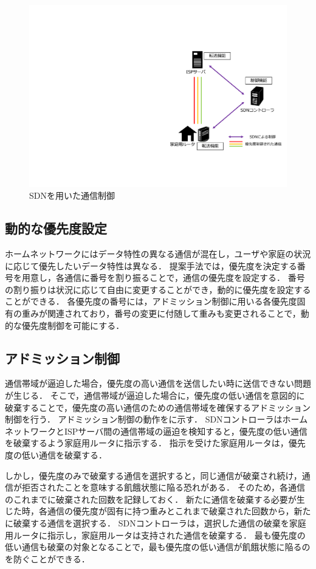\documentclass[a4paper,10pt,twocolumn,uplatex]{jsarticle}
\begin{document}
\begin{figure}[t]
	\begin{centering}
    \includegraphics[width=0.7\linewidth]{img/proposal_resume.pdf}
    \caption{SDNを用いた通信制御}
    \label{fig:proposal}
    \end{centering}
\end{figure}

\subsection{動的な優先度設定}
\label{priority}
ホームネットワークにはデータ特性の異なる通信が混在し，ユーザや家庭の状況に応じて優先したいデータ特性は異なる．
提案手法では，優先度を決定する番号を用意し，各通信に番号を割り振ることで，通信の優先度を設定する．
番号の割り振りは状況に応じて自由に変更することができ，動的に優先度を設定することができる．
各優先度の番号には，アドミッション制御に用いる各優先度固有の重みが関連されており，番号の変更に付随して重みも変更されることで，動的な優先度制御を可能にする．

\subsection{アドミッション制御}
通信帯域が逼迫した場合，優先度の高い通信を送信したい時に送信できない問題が生じる．
そこで，通信帯域が逼迫した場合に，優先度の低い通信を意図的に破棄することで，優先度の高い通信のための通信帯域を確保するアドミッション制御を行う．
アドミッション制御の動作をに示す．
SDNコントローラはホームネットワークとISPサーバ間の通信帯域の逼迫を検知すると，優先度の低い通信を破棄するよう家庭用ルータに指示する．
指示を受けた家庭用ルータは，優先度の低い通信を破棄する．\par
しかし，優先度のみで破棄する通信を選択すると，同じ通信が破棄され続け，通信が拒否されたことを意味する飢餓状態に陥る恐れがある．
そのため，各通信のこれまでに破棄された回数を記録しておく．
新たに通信を破棄する必要が生じた時，各通信の優先度が固有に持つ重みとこれまで破棄された回数から，新たに破棄する通信を選択する．
SDNコントローラは，選択した通信の破棄を家庭用ルータに指示し，家庭用ルータは支持された通信を破棄する．
最も優先度の低い通信も破棄の対象となることで，最も優先度の低い通信が飢餓状態に陥るのを防ぐことができる．
\end{document}

